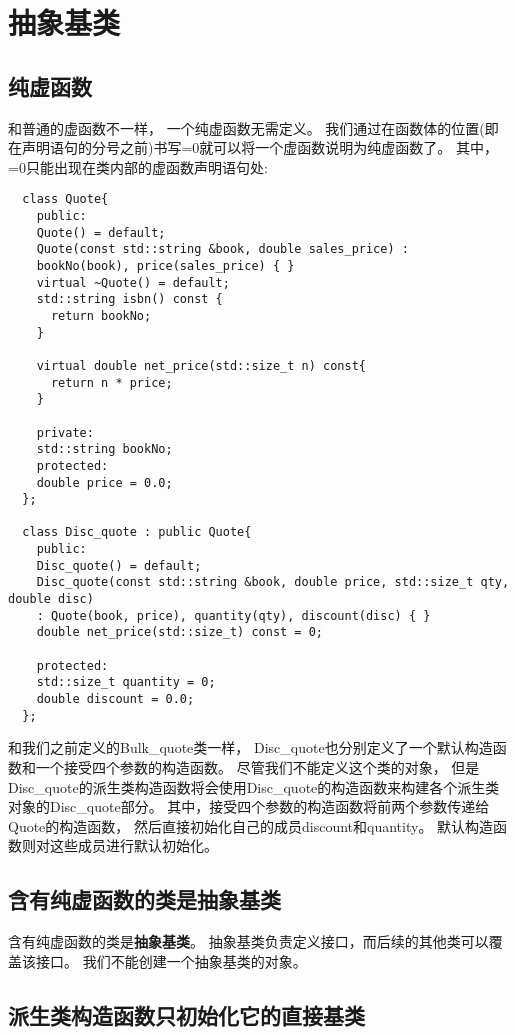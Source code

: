 \section{抽象基类}
\subsection{纯虚函数}
和普通的虚函数不一样，%
一个纯虚函数无需定义。%
我们通过在函数体的位置(即在声明语句的分号之前)书写=0就可以将一个虚函数说明为纯虚函数了。%
其中，=0只能出现在类内部的虚函数声明语句处:
\begin{lstlisting}
  class Quote{
    public:
    Quote() = default;
    Quote(const std::string &book, double sales_price) :
    bookNo(book), price(sales_price) { }
    virtual ~Quote() = default;
    std::string isbn() const {
      return bookNo;
    }

    virtual double net_price(std::size_t n) const{
      return n * price;
    }

    private:
    std::string bookNo;
    protected:
    double price = 0.0;
  };

  class Disc_quote : public Quote{
    public:
    Disc_quote() = default;
    Disc_quote(const std::string &book, double price, std::size_t qty, double disc)
    : Quote(book, price), quantity(qty), discount(disc) { }
    double net_price(std::size_t) const = 0;

    protected:
    std::size_t quantity = 0;
    double discount = 0.0;
  };
\end{lstlisting}
和我们之前定义的Bulk\_quote类一样，%
Disc\_quote也分别定义了一个默认构造函数和一个接受四个参数的构造函数。%
尽管我们不能定义这个类的对象，%
但是Disc\_quote的派生类构造函数将会使用Disc\_quote的构造函数来构建各个派生类对象的Disc\_quote部分。%
其中，接受四个参数的构造函数将前两个参数传递给Quote的构造函数，%
然后直接初始化自己的成员discount和quantity。%
默认构造函数则对这些成员进行默认初始化。%
\subsection{含有纯虚函数的类是抽象基类}
含有纯虚函数的类是{\bfseries{抽象基类}}。%
抽象基类负责定义接口，而后续的其他类可以覆盖该接口。%
我们不能创建一个抽象基类的对象。%
\subsection{派生类构造函数只初始化它的直接基类}
{}

